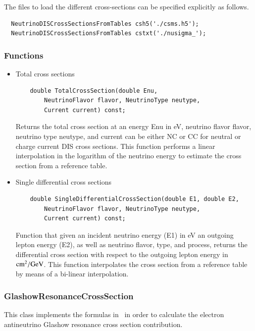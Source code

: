 \documentclass[3p,12pt]{elsarticle}
\newcommand{\ttf}{\ttfamily}
\begin{document}
The files to load the different cross-sections can be specified
explicitly as follows. 
\begin{lstlisting}
  NeutrinoDISCrossSectionsFromTables csh5('./csms.h5');
  NeutrinoDISCrossSectionsFromTables cstxt('./nusigma_');
\end{lstlisting}

\subsubsection{Functions}

\begin{itemize}
\item Total cross sections
  \begin{lstlisting}
    double TotalCrossSection(double Enu,
    	NeutrinoFlavor flavor, NeutrinoType neutype,
    	Current current) const;
      \end{lstlisting}
      
  Returns the total cross section at an energy {\ttf Enu} in eV, neutrino
  flavor {\ttf flavor}, neutrino type {\ttf neutype}, and {\ttf
    current} can be either {\ttf NC} or {\ttf CC} for neutral or
  charge current DIS cross sections. This function performs a linear interpolation in
  the logarithm of the neutrino energy to estimate the cross section from a reference table.
     
\item Single differential cross sections              
  \begin{lstlisting}
    double SingleDifferentialCrossSection(double E1, double E2,
    	NeutrinoFlavor flavor, NeutrinoType neutype,
    	Current current) const;
  \end{lstlisting}
      Function that given an incident neutrino energy ({\ttf E1}) in eV an outgoing lepton energy ({\ttf E2}), as well as neutrino flavor,
       type, and process, returns the differential cross section with
       respect to the outgoing lepton energy in ${\rm cm}^2/{\rm
         GeV}$. This function interpolates the cross section from a reference table by means of a bi-linear interpolation.
\end{itemize}

\subsubsection{GlashowResonanceCrossSection\label{sec:neutrino_cross_section_glashow}}

This class implements the formulas in~\citep{GhandiReno} in order to calculate the electron antineutrino Glashow resonance cross section contribution.
\end{document}
